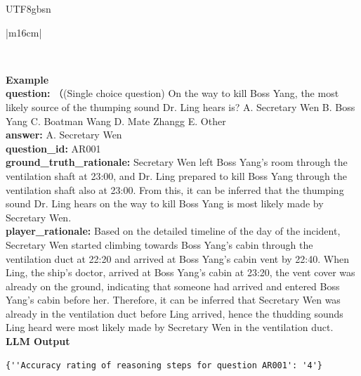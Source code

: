 \documentclass[11pt]{article}
\begin{document}
{\begin{CJK}{UTF8}{gbsn}
\begin{table}[t!]
\begin{minipage}[t!]{\linewidth}
\begin{tabular}{|m{16cm}|}
\begin{minipage}[t]{\linewidth}
\begin{verbatim}
\end{verbatim}
\end{minipage} \\
\hline
{}  \textbf{Example}  \\
 \textbf{  question:} \small（(Single choice question) On the way to kill Boss Yang, the most likely source of the thumping sound Dr. Ling hears is? A. Secretary Wen B. Boss Yang C. Boatman Wang D. Mate Zhangg E. Other\\
  \textbf{  answer:} \small A. Secretary Wen\\
  \textbf{  question\_id:} \small AR001\\
    \textbf{  ground\_truth\_rationale:} \small Secretary Wen left Boss Yang's room through the ventilation shaft at 23:00, and Dr. Ling prepared to kill Boss Yang through the ventilation shaft also at 23:00. From this, it can be inferred that the thumping sound Dr. Ling hears on the way to kill Boss Yang is most likely made by Secretary Wen.\\
        \textbf{  player\_rationale:} \small Based on the detailed timeline of the day of the incident, Secretary Wen started
climbing towards Boss Yang's cabin through the ventilation duct at 22:20 and arrived at Boss Yang's
cabin vent by 22:40. When Ling, the ship's doctor, arrived at Boss Yang's cabin at 23:20, the vent cover
was already on the ground, indicating that someone had arrived and entered Boss Yang's cabin before her.
Therefore, it can be inferred that Secretary Wen was already in the ventilation duct before Ling arrived, 
hence the thudding sounds Ling heard were most likely made by Secretary Wen in the ventilation duct.\\
\hline
{}  \textbf{LLM Output}  \\
\hline
\begin{minipage}[t]{\linewidth}
\small\begin{verbatim}
{''Accuracy rating of reasoning steps for question AR001': '4'}

\end{verbatim}
\end{minipage} \\

\hline

\end{tabular}
\end{minipage}

\caption{LLM prompts and outputs for inferential question answering and automatic evaluation. (English Translation)}
\label{table:prompt_inferential_qa_eng}
\end{table}
\end{CJK}






}
\end{document}
